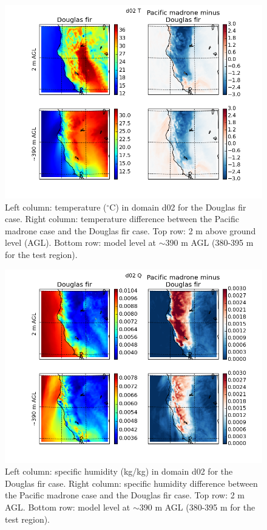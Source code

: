 \begin{figure}[here]
\includegraphics[width=1\textwidth]{ch2-BL/figures/T_d02_s0pt08.png}
\caption{Left column: temperature ($^\circ$C) in domain d02 for the Douglas fir case.  Right column: temperature difference between the Pacific madrone case and the Douglas fir case.  Top row: 2 m above ground level (AGL).  Bottom row: model level at $\sim$390 m AGL (380-395 m for the test region).}
\label{fig:BL_WRFmapT}
\end{figure}

\begin{figure}[here]
\includegraphics[width=1\textwidth]{ch2-BL/figures/Q_d02_s0pt08.png}
\caption{Left column: specific humidity (kg/kg) in domain d02 for the Douglas fir case.  Right column: specific humidity difference between the Pacific madrone case and the Douglas fir case.  Top row: 2 m AGL.  Bottom row: model level at $\sim$390 m AGL (380-395 m for the test region).}
\label{fig:BL_WRFmapQ}
\end{figure}

